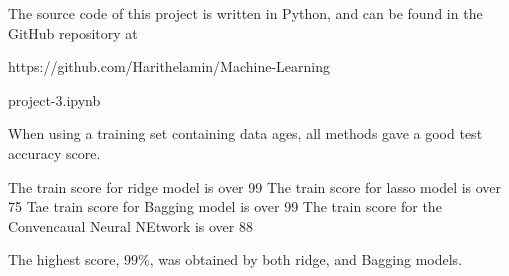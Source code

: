 \begin{Results}


The source code of this project is written in Python, and can be found in the GitHub repository at 

https://github.com/Harithelamin/Machine-Learning

project-3.ipynb

When using a training set containing data ages, all methods gave a good test accuracy score.

The train score for ridge model is over 99%
The train score for lasso model is over 75%
Tae train score for Bagging model is over 99%
The train score for the Convencaual Neural NEtwork is over 88%

The highest score, $99\%$, was obtained by both ridge, and  Bagging models. 


\end{Results}